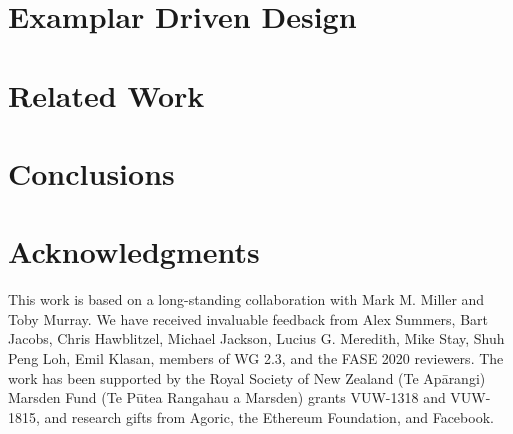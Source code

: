 \documentclass[runningheads]{llncs}
\newcommand{\sd}[1]{#1} %
\newcommand{\sophia}[1]{#1} %
\newcommand{\susan}[1]{#1} %
\begin{document}





\section{Examplar Driven Design}
\label{sect:discussion} 


\section{Related Work}
\label{sect:related}


\section{Conclusions}
\label{sect:conclusion}


\section{Acknowledgments}

\sophia{This work is based on a long-standing collaboration with Mark M. Miller and Toby Murray.
We have received invaluable feedback from Alex Summers, Bart Jacobs,  Chris Hawblitzel,
Michael Jackson, Lucius G. Meredith,
Mike Stay, Shuh Peng Loh,  Emil Klasan, members of WG 2.3, 
and the FASE 2020  reviewers.
The work has been supported by the 
Royal Society of New Zealand (Te Ap\={a}rangi) Marsden Fund (Te P\={u}tea Rangahau a Marsden)
grants VUW-1318 and VUW-1815, and research gifts from Agoric\susan{, the Ethereum Foundation,} and
Facebook.}



\end{document}
